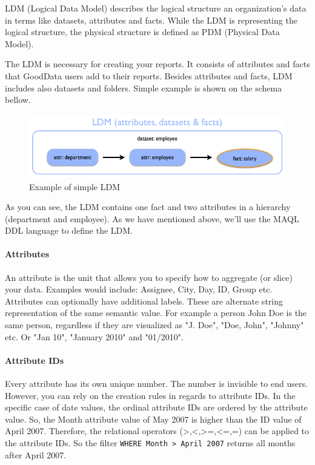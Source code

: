 \documentclass[a4paper, 12pt, titlepage, fleqn]{article}
\begin{document}
LDM (Logical Data Model) describes the logical structure an organization's data in terms like datasets, attributes and facts. While the LDM is representing the logical structure, the physical structure is defined as PDM (Physical Data Model). 

The LDM is necessary for creating your reports. It consists of attributes and facts that GoodData users add to their reports. Besides attributes and facts, LDM includes also datasets and folders. Simple example is shown on the schema bellow. 

\begin{figure}[htb]
\centering
\includegraphics[scale=0.5]{images/ldm-model.png}
\caption{Example of simple LDM}
\label{fig:ldm}
\end{figure}

As you can see, the LDM contains one fact and two attributes in a hierarchy (department and employee). As we have mentioned above, we'll use the MAQL DDL language to define the LDM.

\paragraph*{Attributes} An attribute is the unit that allows you to specify how to aggregate (or slice) your data. Examples would include: Assignee, City, Day, ID, Group etc. Attributes can optionally have additional labels. These are alternate string representation of the same semantic value. For example a person John Doe is the same person, regardless if they are visualized as "J. Doe", "Doe, John", "Johnny" etc. Or "Jan 10", "January 2010" and "01/2010".

\paragraph*{Attribute IDs} Every attribute has its own unique number. The number is invisible to end users. However, you can rely on the creation rules in regards to attribute IDs. In the specific case of date values, the ordinal attribute IDs are ordered by the attribute value. So, the Month attribute value of May 2007 is higher than the ID value of April 2007. Therefore, the relational operators (>,<,>=,<=,=) can be applied to the attribute IDs. So the filter \verb=WHERE Month > April 2007= returns all months after April 2007.
\end{document}
